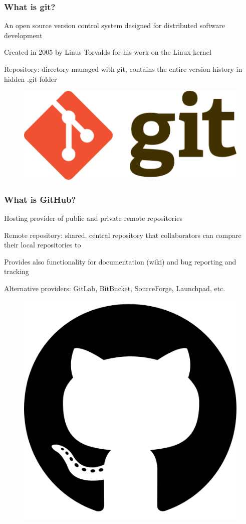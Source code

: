 \documentclass{beamer}
\begin{document}
\begin{frame}
\frametitle{What is git?}

\bigskip

An open source version control system designed for distributed software development

\bigskip

Created in 2005 by Linus Torvalds for his work on the Linux kernel

\bigskip

Repository: directory managed with git, contains the entire version history in hidden .git folder

\vspace{1cm}

		\begin{figure}
			\includegraphics[width=0.3\linewidth]{images/Git-logo.png}
		\end{figure}

\end{frame}


\begin{frame}
\frametitle{What is GitHub?}

\bigskip

Hosting provider of public and private remote repositories

\bigskip

Remote repository: shared, central repository that collaborators can compare their local repositories to

\bigskip

Provides also functionality for documentation (wiki) and bug reporting and tracking

\bigskip

Alternative providers: GitLab, BitBucket, SourceForge, Launchpad, etc.


\begin{figure}
	\includegraphics[width=0.2\linewidth]{images/github-logo.png}
\end{figure}

\end{frame}
\end{document}
